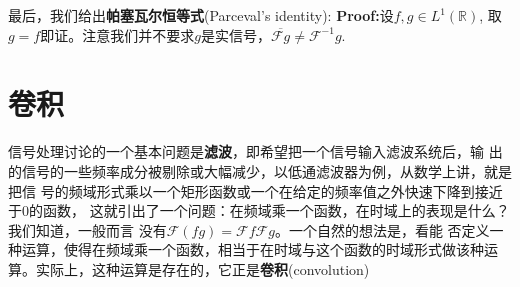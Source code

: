 \documentclass{ctexbook}
\begin{document}
最后，我们给出\textbf{帕塞瓦尔恒等式}(Parceval's identity):
\textbf{Proof:}设$f,g\in L^1(\mathbb{R})$,
取$g=f$即证。注意我们并不要求$g$是实信号，$\overline{\mathcal{F} g}\neq\mathcal{F} ^{-1}g$.

\section{卷积}\label{sec:convolution}

信号处理讨论的一个基本问题是\textbf{滤波}，即希望把一个信号输入滤波系统后，输
出的信号的一些频率成分被剔除或大幅减少，以低通滤波器为例，从数学上讲，就是把信
号的频域形式乘以一个矩形函数或一个在给定的频率值之外快速下降到接近于0的函数，
这就引出了一个问题：在频域乘一个函数，在时域上的表现是什么？我们知道，一般而言
没有$\mathcal{F} (fg)=\mathcal{F} f\mathcal{F} g$。一个自然的想法是，看能
否定义一种运算，使得在频域乘一个函数，相当于在时域与这个函数的时域形式做该种运
算。实际上，这种运算是存在的，它正是\textbf{卷积}(convolution)
\end{document}
